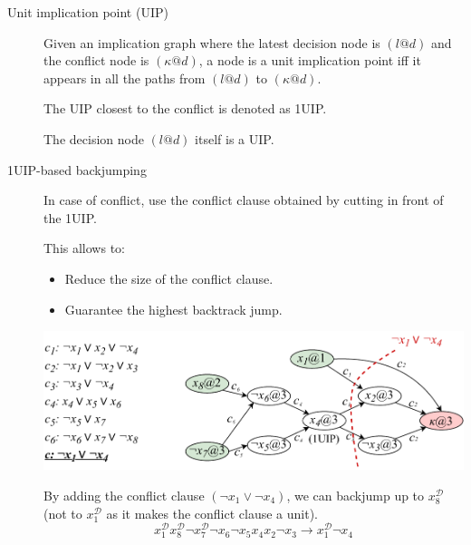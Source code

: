 \begin{description}
    \item[Unit implication point (UIP)]
        Given an implication graph where the latest decision node is $(l@d)$ and the conflict node is $(\kappa@d)$,
        a node is a unit implication point iff it appears in all the paths from $(l@d)$ to $(\kappa@d)$.

        The UIP closest to the conflict is denoted as 1UIP.

        \begin{remark}
            The decision node $(l@d)$ itself is a UIP.
        \end{remark}

    \item[1UIP-based backjumping]
        In case of conflict, use the conflict clause obtained by cutting in front of the 1UIP.

        \begin{remark}
            This allows to:
            \begin{itemize}
                \item Reduce the size of the conflict clause.
                \item Guarantee the highest backtrack jump.
            \end{itemize}
        \end{remark}

        \begin{example}
            \phantom{}
            \begin{center}
                \includegraphics[width=0.75\linewidth]{./img/_cdcl_1uip.pdf}
            \end{center}
            By adding the conflict clause $(\lnot x_1 \vee \lnot x_4)$, we can backjump up to $x_8^\mathcal{D}$ 
            (not to $x_1^\mathcal{D}$ as it makes the conflict clause a unit).
            \[ x_1^\mathcal{D} x_8^\mathcal{D} \lnot x_7^\mathcal{D} \lnot x_6 \lnot x_5 x_4 x_2 \lnot x_3 \rightarrow x_1^\mathcal{D} \lnot x_4\]
        \end{example}
\end{description}